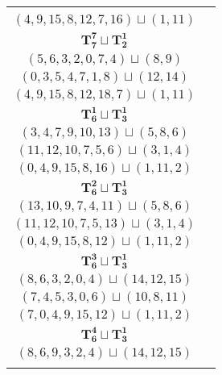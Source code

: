 \documentclass{article}
\begin{document}
\begin{longtable}{|c|c|}
\begin{tabular}{c}
        $(0,3,5,8,9,4,1)\sqcup(12,14)$ \\ 
        $(4,9,15,8,12,7,16)\sqcup(1,11)$
        \end{tabular} \\ 
        \hline
        $\mathbf{T_{7}^{7}} \sqcup \mathbf{T_{2}^{1}}$ & \begin{tabular}{c}
        $(2,4,6,9,12,1,8)\sqcup(14,15)$ \\ 
        $(5,6,3,2,0,7,4)\sqcup(8,9)$ \\ 
        $(0,3,5,4,7,1,8)\sqcup(12,14)$ \\ 
        $(4,9,15,8,12,18,7)\sqcup(1,11)$
        \end{tabular} \\ 
        \hline
        $\mathbf{T_{6}^{1}} \sqcup \mathbf{T_{3}^{1}}$ & \begin{tabular}{c}
        $(1,2,4,6,9,12)\sqcup(13,14,15)$ \\ 
        $(3,4,7,9,10,13)\sqcup(5,8,6)$ \\ 
        $(11,12,10,7,5,6)\sqcup(3,1,4)$ \\ 
        $(0,4,9,15,8,16)\sqcup(1,11,2)$
        \end{tabular} \\ 
        \hline
        $\mathbf{T_{6}^{2}} \sqcup \mathbf{T_{3}^{1}}$ & \begin{tabular}{c}
        $(1,2,4,6,9,5)\sqcup(13,14,15)$ \\ 
        $(13,10,9,7,4,11)\sqcup(5,8,6)$ \\ 
        $(11,12,10,7,5,13)\sqcup(3,1,4)$ \\ 
        $(0,4,9,15,8,12)\sqcup(1,11,2)$
        \end{tabular} \\ 
        \hline
        $\mathbf{T_{6}^{3}} \sqcup \mathbf{T_{3}^{1}}$ & \begin{tabular}{c}
        $(0,1,2,4,6,5)\sqcup(16,13,14)$ \\ 
        $(8,6,3,2,0,4)\sqcup(14,12,15)$ \\ 
        $(7,4,5,3,0,6)\sqcup(10,8,11)$ \\ 
        $(7,0,4,9,15,12)\sqcup(1,11,2)$
        \end{tabular} \\ 
        \hline
        $\mathbf{T_{6}^{4}} \sqcup \mathbf{T_{3}^{1}}$ & \begin{tabular}{c}
        $(1,2,5,4,6,7)\sqcup(16,14,13)$ \\ 
        $(8,6,9,3,2,4)\sqcup(14,12,15)$ \\ 

\end{tabular}
\end{longtable}
\end{document}
